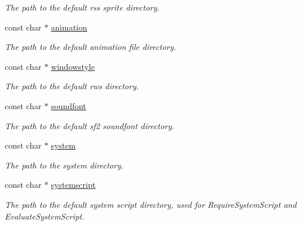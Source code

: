 \begin{DoxyCompactItemize}
\begin{DoxyCompactList}\small\item\em The path to the default rss sprite directory. \end{DoxyCompactList}\item 
\hypertarget{structTS__Directories_a042d5229e3342da38dfa7fe18ba49607}{const char $\ast$ \hyperlink{structTS__Directories_a042d5229e3342da38dfa7fe18ba49607}{animation}}\label{structTS__Directories_a042d5229e3342da38dfa7fe18ba49607}

\begin{DoxyCompactList}\small\item\em The path to the default animation file directory. \end{DoxyCompactList}\item 
\hypertarget{structTS__Directories_ac16426df587b2bf60ae8b8845129e199}{const char $\ast$ \hyperlink{structTS__Directories_ac16426df587b2bf60ae8b8845129e199}{windowstyle}}\label{structTS__Directories_ac16426df587b2bf60ae8b8845129e199}

\begin{DoxyCompactList}\small\item\em The path to the default rws directory. \end{DoxyCompactList}\item 
\hypertarget{structTS__Directories_ae560b569aa270f2c8f9432ad708c147f}{const char $\ast$ \hyperlink{structTS__Directories_ae560b569aa270f2c8f9432ad708c147f}{soundfont}}\label{structTS__Directories_ae560b569aa270f2c8f9432ad708c147f}

\begin{DoxyCompactList}\small\item\em The path to the default sf2 soundfont directory. \end{DoxyCompactList}\item 
\hypertarget{structTS__Directories_af60b22f99a3cf5a63229912e9510248f}{const char $\ast$ \hyperlink{structTS__Directories_af60b22f99a3cf5a63229912e9510248f}{system}}\label{structTS__Directories_af60b22f99a3cf5a63229912e9510248f}

\begin{DoxyCompactList}\small\item\em The path to the system directory. \end{DoxyCompactList}\item 
\hypertarget{structTS__Directories_a1cad8adce484d432357015166b1e448c}{const char $\ast$ \hyperlink{structTS__Directories_a1cad8adce484d432357015166b1e448c}{systemscript}}\label{structTS__Directories_a1cad8adce484d432357015166b1e448c}

\begin{DoxyCompactList}\small\item\em The path to the default system script directory, used for Require\-System\-Script and Evaluate\-System\-Script. \end{DoxyCompactList}\end{DoxyCompactItemize}


